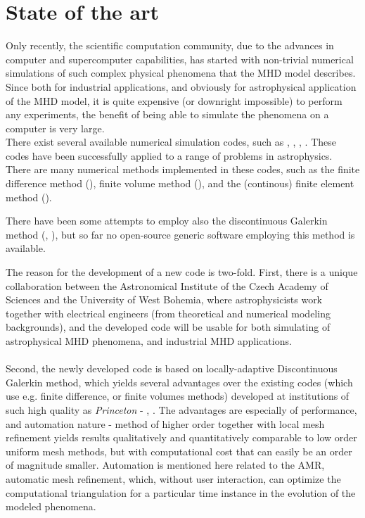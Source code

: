 \section{State of the art}
Only recently, the scientific computation community, due to the advances in computer and supercomputer capabilities, has started with non-trivial numerical simulations of such complex physical phenomena that the MHD model describes. Since both for industrial applications, and obviously for astrophysical application of the MHD model, it is quite expensive (or downright impossible) to perform any experiments, the benefit of being able to simulate the phenomena on a computer is very large.\\
There exist several available numerical simulation codes, such as \cite{athena}, \cite{zeus}, \cite{ramses}, \cite{honzaFD}. These codes have been successfully applied to a range of problems in astrophysics.\\
There are many numerical methods implemented in these codes, such as the finite difference method (\cite{honzaFD}), finite volume method (\cite{ramses}), and the (continous) finite element method (\cite{honzaFem}).

There have been some attempts to employ also the discontinuous Galerkin method (\cite{mhdDg}, \cite{mhdDg2}), but so far no open-source generic software employing this method is available.

The reason for the development of a new code is two-fold. First, there is a unique collaboration between the Astronomical Institute of the Czech Academy of Sciences and the University of West Bohemia, where astrophysicists work together with electrical engineers (from theoretical and numerical modeling backgrounds), and the developed code will be usable for both simulating of astrophysical MHD phenomena, and industrial MHD applications.
\paragraph{}
Second, the newly developed code is based on locally-adaptive Discontinuous Galerkin method, which yields several advantages over the existing codes (which use e.g. finite difference, or finite volumes methods) developed at institutions of such high quality as \emph{Princeton} - \cite{athena}, \cite{zeus}. The advantages are especially of performance, and automation nature - method of higher order together with local mesh refinement yields results qualitatively and quantitatively comparable to low order uniform mesh methods, but with computational cost that can easily be an order of magnitude smaller. Automation is mentioned here related to the AMR, automatic mesh refinement, which, without user interaction, can optimize the computational triangulation for a particular time instance in the evolution of the modeled phenomena.
